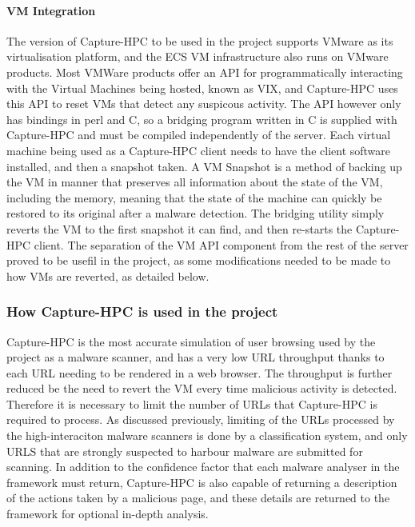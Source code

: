 \paragraph{VM Integration}
The version of Capture-HPC to be used in the project supports VMware as its
virtualisation platform, and the ECS VM infrastructure also runs on VMware
products. Most VMWare products offer an API for programmatically interacting
with the Virtual Machines being hosted, known as VIX, and Capture-HPC uses this
API to reset VMs that detect any suspicous activity. The API however only has
bindings in perl and C,
so a bridging program written in C is supplied with Capture-HPC and must be
compiled independently of the server. Each virtual machine being used as a
Capture-HPC client needs to have the client software installed, and then a
snapshot taken. A VM Snapshot is a method of backing up the VM in manner that
preserves all information about the state of the VM, including the memory,
meaning that the state of the machine can quickly be restored to its original
after a malware detection. The bridging utility simply reverts the VM to the
first snapshot it can find, and then re-starts the Capture-HPC client. The
separation of the VM API component from the rest of the server proved to be
usefil in the project, as some modifications needed to be made to how VMs are
reverted, as detailed below.

\subsubsection{How Capture-HPC is used in the project}

Capture-HPC is the most accurate simulation of user browsing used by the project
as a malware scanner, and has a very low URL throughput thanks to each URL
needing to be rendered in a web browser. The throughput is further reduced be
the need to revert the VM every time malicious activity is detected. Therefore
it is necessary to limit the number of URLs that Capture-HPC is required to
process. As discussed previously, limiting of the URLs processed by the
high-interaciton malware scanners 
is done by a classification system, and only URLS that are strongly suspected to
harbour malware are submitted for scanning. In addition to the confidence factor
that each malware analyser in the framework must return, Capture-HPC is also
capable of returning a description of the actions taken by a malicious page, and
these details are returned to the framework for optional in-depth analysis.

